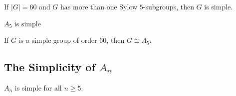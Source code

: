 \documentclass[../main]{subfiles}
\begin{document}
 
 \begin{prop}
  If $|G| = 60$ and $G$ has more than one Sylow $5$-subgroups, then $G$ is simple.
 \end{prop}
 
 
 \begin{cor}
  $A_5$ is simple
 \end{cor}
 
 
 \begin{prop}
  If $G$ is a simple group of order $60$, then $G \cong A_5$. 
 \end{prop}
 
 
 \subsection{The Simplicity of $A_n$}
 
 
 \begin{thm}
  $A_n$ is simple for all $n\geq 5$.
 \end{thm}
 
 
\end{document}
